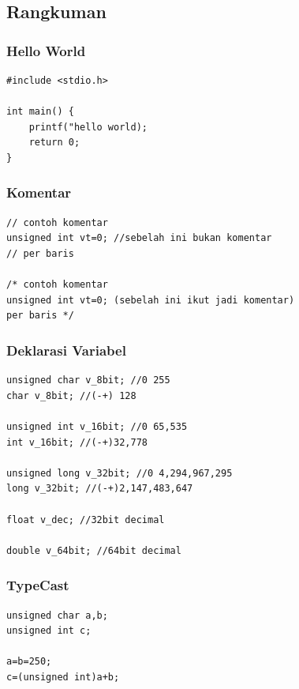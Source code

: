 \documentclass[12pt,]{article}
\begin{document}
	\newpage
	\subsection{Rangkuman}

	\subsubsection{Hello World}
	\begin{verbatim}
#include <stdio.h>

int main() {
	printf("hello world);
	return 0;
}
	\end{verbatim}

	\subsubsection{Komentar}
	\begin{verbatim}
// contoh komentar
unsigned int vt=0; //sebelah ini bukan komentar
// per baris

/* contoh komentar
unsigned int vt=0; (sebelah ini ikut jadi komentar)
per baris */
	\end{verbatim}

	\subsubsection{Deklarasi Variabel}
	\begin{verbatim}
unsigned char v_8bit; //0 255
char v_8bit; //(-+) 128

unsigned int v_16bit; //0 65,535
int v_16bit; //(-+)32,778

unsigned long v_32bit; //0 4,294,967,295
long v_32bit; //(-+)2,147,483,647

float v_dec; //32bit decimal

double v_64bit; //64bit decimal
	\end{verbatim}

	\subsubsection{TypeCast}
	\begin{verbatim}
unsigned char a,b;
unsigned int c;

a=b=250;
c=(unsigned int)a+b;
	\end{verbatim}
\end{document}
